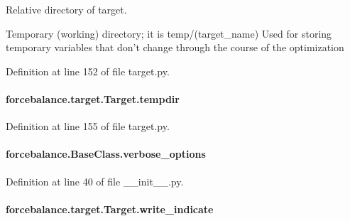 Relative directory of target. 

Temporary (working) directory; it is temp/(target\-\_\-name) Used for storing temporary variables that don't change through the course of the optimization 

Definition at line 152 of file target.\-py.

\hypertarget{classforcebalance_1_1target_1_1Target_aa1f01b5b78db253b5b66384ed11ed193}{
\paragraph[{tempdir}]{\setlength{\rightskip}{0pt plus 5cm}forcebalance.\-target.\-Target.\-tempdir\hspace{0.3cm}{\ttfamily [inherited]}}}\label{classforcebalance_1_1target_1_1Target_aa1f01b5b78db253b5b66384ed11ed193}


Definition at line 155 of file target.\-py.

\hypertarget{classforcebalance_1_1BaseClass_afd68efa29ccd2f320f4cf82198214aac}{
\paragraph[{verbose\-\_\-options}]{\setlength{\rightskip}{0pt plus 5cm}forcebalance.\-Base\-Class.\-verbose\-\_\-options\hspace{0.3cm}{\ttfamily [inherited]}}}\label{classforcebalance_1_1BaseClass_afd68efa29ccd2f320f4cf82198214aac}


Definition at line 40 of file \-\_\-\-\_\-init\-\_\-\-\_\-.\-py.

\hypertarget{classforcebalance_1_1target_1_1Target_a3a2f5d4bbb8d6ecb580eadb261977a57}{
\paragraph[{write\-\_\-indicate}]{\setlength{\rightskip}{0pt plus 5cm}forcebalance.\-target.\-Target.\-write\-\_\-indicate\hspace{0.3cm}{\ttfamily [inherited]}}}\label{classforcebalance_1_1target_1_1Target_a3a2f5d4bbb8d6ecb580eadb261977a57}


